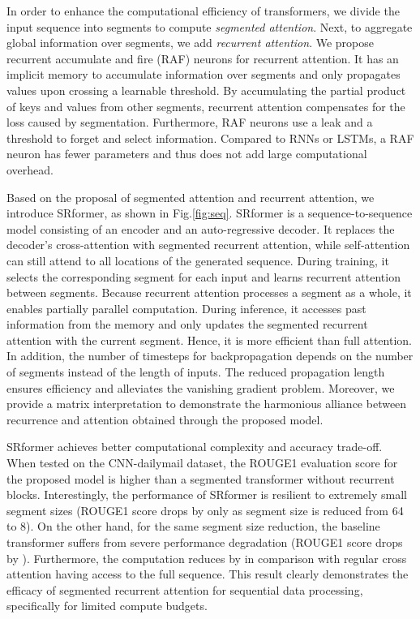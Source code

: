 \documentclass[11pt]{article}
\begin{document}
In order to enhance the computational efficiency of transformers, we divide the input sequence into segments to compute \textit{segmented attention}. Next, to aggregate global information over segments, we add \textit{recurrent attention}. We propose recurrent accumulate and fire (RAF) neurons for recurrent attention. It has an implicit memory to accumulate information over segments and only propagates values upon crossing a learnable threshold. By accumulating the partial product of keys and values from other segments, recurrent attention compensates for the loss caused by segmentation. Furthermore, RAF neurons use a leak and a threshold to forget and select information. 
Compared to RNNs or LSTMs, a RAF neuron has fewer parameters and thus does not add large computational overhead.   

Based on the proposal of segmented attention and recurrent attention, we introduce SRformer, as shown in Fig.\ref{fig:seq}. SRformer is a sequence-to-sequence model consisting of an encoder and an auto-regressive decoder. It replaces the decoder's cross-attention with segmented recurrent attention, while self-attention can still attend to all locations of the generated sequence. During training, it selects the corresponding segment for each input and learns recurrent attention between segments. Because recurrent attention processes a segment as a whole, it enables partially parallel computation.
During inference, it accesses past information from the memory and only updates the segmented recurrent attention with the current segment. Hence, it is more efficient than full attention. In addition, the number of timesteps for backpropagation depends on the number of segments instead of the length of inputs. The reduced propagation length ensures efficiency and alleviates the vanishing gradient problem. Moreover, we provide a matrix interpretation to demonstrate the harmonious alliance between recurrence and attention obtained through the proposed model.

SRformer achieves better computational complexity and accuracy trade-off. When tested on the CNN-dailymail dataset, the ROUGE1 evaluation score for the proposed model is  higher than a segmented transformer without recurrent blocks. Interestingly, the performance of SRformer is resilient to extremely small segment sizes (ROUGE1 score drops by only  as segment size is reduced from 64 to 8). On the other hand, for the same segment size reduction, the baseline transformer suffers from severe performance degradation (ROUGE1 score drops  by ). Furthermore, the computation reduces by  in comparison with regular cross attention having access to the full sequence. This result clearly demonstrates the efficacy of segmented recurrent attention for sequential data processing, specifically for limited compute budgets.
\end{document}
